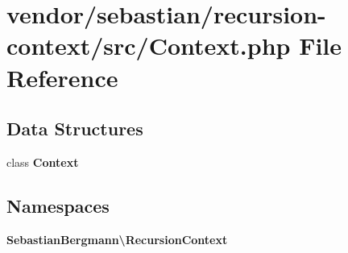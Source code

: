 \section{vendor/sebastian/recursion-\/context/src/\+Context.php File Reference}
\label{sebastian_2recursion-context_2src_2_context_8php}
\subsection*{Data Structures}
\begin{DoxyCompactItemize}
\item 
class {\bf Context}
\end{DoxyCompactItemize}
\subsection*{Namespaces}
\begin{DoxyCompactItemize}
\item 
 {\bf Sebastian\+Bergmann\textbackslash{}\+Recursion\+Context}
\end{DoxyCompactItemize}

